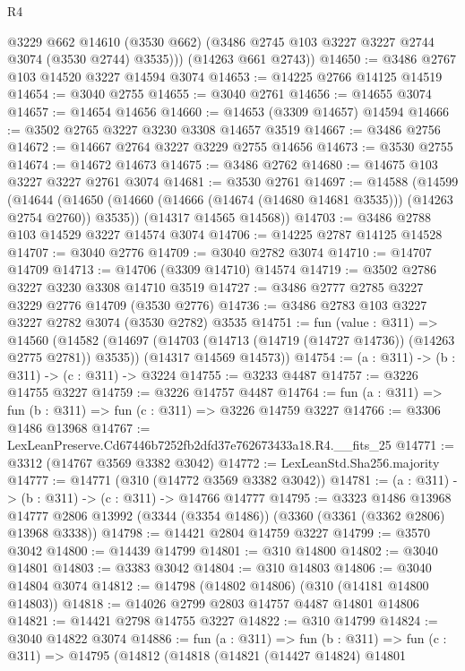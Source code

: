 \begin{lexlean}{R4}
\begin{coremodule}
          @3229
          @662
          @14610
          (@3530 @662)
          (@3486 @2745 @103 @3227 @3227 @2744 @3074 (@3530 @2744) @3535)))
      (@14263 @661 @2743))
@14650 := @3486 @2767 @103 @14520 @3227 @14594 @3074
@14653 := @14225 @2766 @14125 @14519
@14654 := @3040 @2755
@14655 := @3040 @2761
@14656 := @14655 @3074
@14657 := @14654 @14656
@14660 := @14653 (@3309 @14657) @14594
@14666 := @3502 @2765 @3227 @3230 @3308 @14657 @3519
@14667 := @3486 @2756
@14672 := @14667 @2764 @3227 @3229 @2755 @14656
@14673 := @3530 @2755
@14674 := @14672 @14673
@14675 := @3486 @2762
@14680 := @14675 @103 @3227 @3227 @2761 @3074
@14681 := @3530 @2761
@14697 := @14588
    (@14599
      (@14644 (@14650 (@14660 (@14666 (@14674 (@14680 @14681 @3535))) (@14263 @2754 @2760)) @3535))
      (@14317 @14565 @14568))
@14703 := @3486 @2788 @103 @14529 @3227 @14574 @3074
@14706 := @14225 @2787 @14125 @14528
@14707 := @3040 @2776
@14709 := @3040 @2782 @3074
@14710 := @14707 @14709
@14713 := @14706 (@3309 @14710) @14574
@14719 := @3502 @2786 @3227 @3230 @3308 @14710 @3519
@14727 := @3486 @2777 @2785 @3227 @3229 @2776 @14709 (@3530 @2776)
@14736 := @3486 @2783 @103 @3227 @3227 @2782 @3074 (@3530 @2782) @3535
@14751 := fun (value : @311) =>
  @14560
    (@14582
      (@14697 (@14703 (@14713 (@14719 (@14727 @14736)) (@14263 @2775 @2781)) @3535))
      (@14317 @14569 @14573))
@14754 := (a : @311) -> (b : @311) -> (c : @311) -> @3224
@14755 := @3233 @4487
@14757 := @3226 @14755 @3227
@14759 := @3226 @14757 @4487
@14764 := fun (a : @311) => fun (b : @311) => fun (c : @311) => @3226 @14759 @3227
@14766 := @3306 @1486 @13968
@14767 := LexLeanPreserve.Cd67446b7252fb2dfd37e762673433a18.R4.__fits_25
@14771 := @3312 (@14767 @3569 @3382 @3042)
@14772 := LexLeanStd.Sha256.majority
@14777 := @14771 (@310 (@14772 @3569 @3382 @3042))
@14781 := (a : @311) -> (b : @311) -> (c : @311) -> @14766 @14777
@14795 := @3323
    @1486
    @13968
    @14777
    @2806
    @13992
    (@3344 (@3354 @1486))
    (@3360 (@3361 (@3362 @2806) @13968 @3338))
@14798 := @14421 @2804 @14759 @3227
@14799 := @3570 @3042
@14800 := @14439 @14799
@14801 := @310 @14800
@14802 := @3040 @14801
@14803 := @3383 @3042
@14804 := @310 @14803
@14806 := @3040 @14804 @3074
@14812 := @14798 (@14802 @14806) (@310 (@14181 @14800 @14803))
@14818 := @14026 @2799 @2803 @14757 @4487 @14801 @14806
@14821 := @14421 @2798 @14755 @3227
@14822 := @310 @14799
@14824 := @3040 @14822 @3074
@14886 := fun (a : @311) =>
  fun (b : @311) =>
  fun (c : @311) =>
  @14795
    (@14812
      (@14818
        (@14821
          (@14427 @14824)
          @14801

\end{coremodule}
\end{lexlean}

